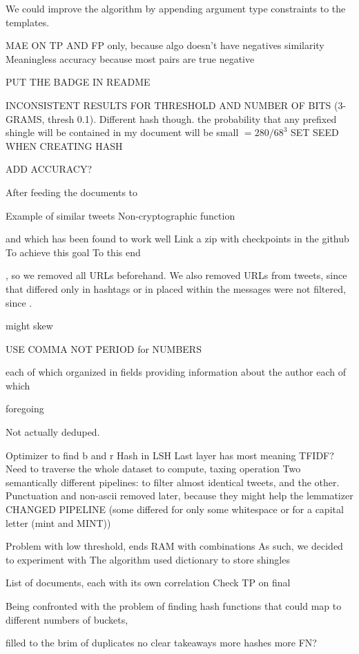 \documentclass[runningheads]{llncs}
\begin{document}
We could improve the algorithm by appending argument type constraints to the templates.

MAE ON TP AND FP only, because algo doesn't have negatives similarity
Meaningless accuracy because most pairs are true negative

PUT THE BADGE IN README

INCONSISTENT RESULTS FOR THRESHOLD AND NUMBER OF BITS (3-GRAMS, thresh 0.1). Different hash though.
the probability that any prefixed shingle will be contained in my document will be small $= 280 / 68^3$
SET SEED WHEN CREATING HASH

ADD ACCURACY?

After feeding the documents to 

Example of similar tweets
Non-cryptographic function

and which has been found to work well  
Link a zip with checkpoints in the github
To achieve this goal
To this end

, so we removed all URLs 
beforehand. 
We also removed URLs from tweets, since that differed only in hashtags or in  placed within the messages were not filtered, since . 

might skew

USE COMMA NOT PERIOD for NUMBERS

each of which organized in fields providing information about the author
each of which  

foregoing

Not actually deduped.

Optimizer to find b and r
Hash in LSH
Last layer has most meaning
TFIDF? Need to traverse the whole dataset to compute, taxing operation
Two semantically different pipelines: to filter almost identical tweets, and the other.
Punctuation and non-ascii removed later, because they might help the lemmatizer
CHANGED PIPELINE (some differed for only some whitespace or for a capital letter (mint and MINT))

Problem with low threshold, ends RAM with combinations
As such, we decided to experiment with   
The algorithm 
used dictionary to store shingles 

List of documents, each with its own correlation
Check TP on final


Being confronted with the problem of finding hash functions that could map to different numbers of buckets,

filled to the brim of duplicates
no clear takeaways
more hashes more FN?
\end{document}
